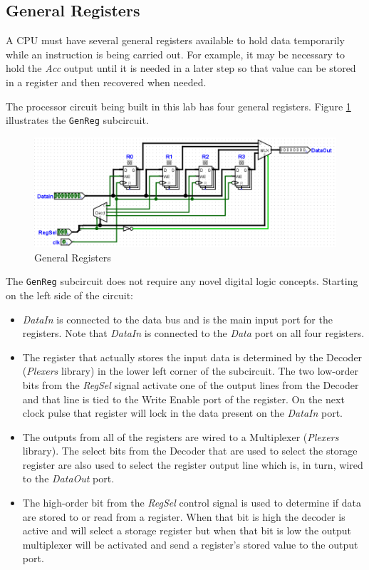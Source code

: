 \subsection{General Registers}

A \ac{CPU} must have several general registers available to hold data temporarily while an instruction is being carried out. For example, it may be necessary to hold the \textit{Acc} output until it is needed in a later step so that value can be stored in a register and then recovered when needed. 

The processor circuit being built in this lab has four general registers. Figure \ref{fig:11-04} illustrates the \lstinline[columns=fixed]|GenReg| subcircuit.

\begin{figure}[H]
	\centering
	\includegraphics[width=\maxwidth{.95\linewidth}]{gfx/11-04}
	\caption{General Registers}
	\label{fig:11-04}
\end{figure}

The \lstinline[columns=fixed]|GenReg| subcircuit does not require any novel digital logic concepts. Starting on the left side of the circuit:

\begin{itemize}
	\item \textit{DataIn} is connected to the data bus and is the main input port for the registers. Note that \textit{DataIn} is connected to the \textit{Data} port on all four registers. 
	\item The register that actually stores the input data is determined by the Decoder (\textit{Plexers} library) in the lower left corner of the subcircuit. The two low-order bits from the \textit{RegSel} signal activate one of the output lines from the Decoder and that line is tied to the Write Enable port of the register. On the next clock pulse that register will lock in the data present on the \textit{DataIn} port.
	\item The outputs from all of the registers are wired to a Multiplexer (\textit{Plexers} library). The select bits from the Decoder that are used to select the storage register are also used to select the register output line which is, in turn, wired to the \textit{DataOut} port.
	\item The high-order bit from the \textit{RegSel} control signal is used to determine if data are stored to or read from a register. When that bit is high the decoder is active and will select a storage register but when that bit is low the output multiplexer will be activated and send a register's stored value to the output port.
\end{itemize}

